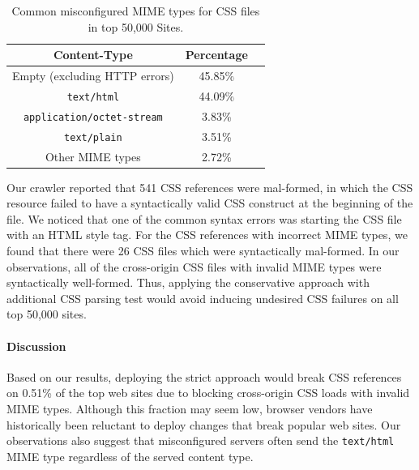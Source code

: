 \documentclass{acm_proc_article-sp}
\begin{document}
\begin{table}
\centering
\begin{tabular}{|c|c|c|} \hline
Content-Type&Percentage\\ \hline
Empty (excluding HTTP errors)&45.85\%\\ \hline
\texttt{text/html}&44.09\%\\ \hline
\texttt{application/octet-stream}&3.83\%\\ \hline
\texttt{text/plain}&3.51\%\\ \hline
Other MIME types&2.72\%\\
\hline\end{tabular}
\caption{Common misconfigured MIME types for CSS files in top 50,000 Sites.}
\label{table:MIME}
\end{table}

Our crawler reported that 541 CSS references were mal-formed, in which the CSS resource failed to have a syntactically valid CSS construct at the beginning of the file. We noticed that one of the common syntax errors was starting the CSS file with an HTML style tag. For the CSS references with incorrect MIME types, we found that there were 26 CSS files which were syntactically mal-formed. In our observations, all of the cross-origin CSS files with invalid MIME types were syntactically well-formed. Thus, applying the conservative approach with additional CSS parsing test would avoid inducing undesired CSS failures on all top 50,000 sites. 


\paragraph{Discussion}
Based on our results, deploying the strict approach would break CSS references on 0.51\% of the top web sites due to blocking cross-origin CSS loads with invalid MIME types. Although this fraction may seem low, browser vendors have historically been reluctant to deploy changes that break popular web sites. Our observations also suggest that misconfigured servers often %
send the \texttt{text/html} MIME type regardless of the served content type.
\end{document}
